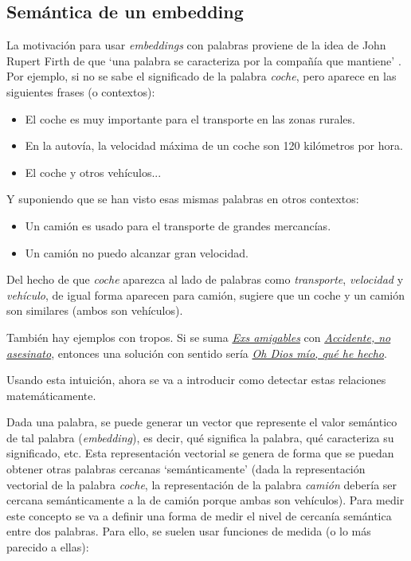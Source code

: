 \subsection*{Semántica de un embedding}

La motivación para usar \textit{embeddings} con palabras proviene de la idea de John Rupert
Firth de que `una palabra se caracteriza por la compañía que mantiene' \cite{firth1957synopsis}. Por ejemplo, si no se sabe
el significado de la palabra \textit{coche}, pero aparece en las siguientes frases (o contextos):
\begin{itemize}
    \item El coche es muy importante para el transporte en las zonas rurales.
    \item En la autovía, la velocidad máxima de un coche son 120 kilómetros por hora.
    \item El coche y otros vehículos...
\end{itemize}
Y suponiendo que se han visto esas mismas palabras en otros contextos:
\begin{itemize}
    \item Un camión es usado para el transporte de grandes mercancías.
    \item Un camión no puedo alcanzar gran velocidad.
\end{itemize}
Del hecho de que \textit{coche} aparezca al lado de palabras como \textit{transporte}, \textit{velocidad} y \textit{vehículo},
de igual forma aparecen para camión, sugiere que un coche y un camión son similares (ambos son vehículos).

También hay ejemplos con tropos. Si se suma \href{https://tvtropes.org/pmwiki/pmwiki.php/Main/AmicableExes}{\textit{Exs amigables}}
con \href{https://tvtropes.org/pmwiki/pmwiki.php/Main/AccidentNotMurder}{\textit{Accidente, no asesinato}}, entonces una solución con sentido sería
\href{https://tvtropes.org/pmwiki/pmwiki.php/Main/MyGodWhatHaveIDone}{\textit{Oh Dios mío, qué he hecho}}.

Usando esta intuición, ahora se va a introducir como detectar estas relaciones matemáticamente.

Dada una palabra, se puede generar un vector que represente el valor semántico de tal palabra (\textit{embedding}), es decir, qué significa la palabra, qué caracteriza
su significado, etc. Esta representación vectorial se genera de forma que se puedan obtener otras palabras
cercanas `semánticamente' (dada la representación vectorial de la palabra \textit{coche}, la representación de la palabra \textit{camión}
debería ser cercana semánticamente a la de camión porque ambas son vehículos). Para medir este concepto se va a definir una forma de medir el nivel
de cercanía semántica entre dos palabras. Para ello, se suelen usar funciones de medida (o lo más parecido a ellas):

